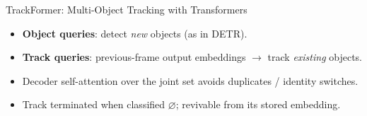 \begin{frame}[fragile]{TrackFormer: Multi-Object Tracking with Transformers}
\begin{center}
  \end{center}

  \begin{itemize}
    \item \textbf{Object queries}: detect \emph{new} objects (as in DETR).
    \item \textbf{Track queries}: previous-frame output embeddings $\to$ track \emph{existing} objects.
    \item Decoder self-attention over the joint set avoids duplicates / identity switches.
    \item Track terminated when classified $\varnothing$; revivable from its stored embedding.
  \end{itemize}
\end{frame}

